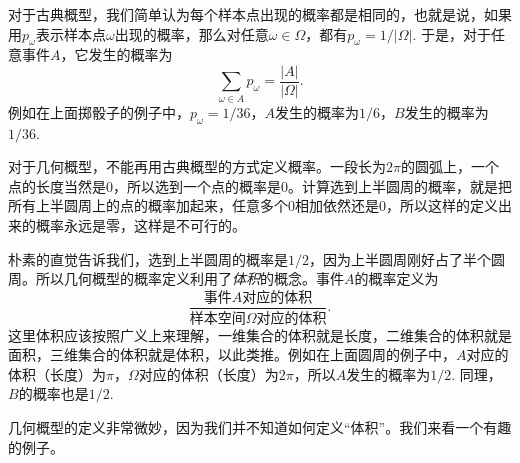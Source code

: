 对于古典概型，我们简单认为每个样本点出现的概率都是相同的，也就是说，如果用$p_\omega$表示样本点$\omega$出现的概率，那么对任意$\omega\in\Omega$，都有$p_\omega = 1/|\Omega|$. 于是，对于任意事件$A$，它发生的概率为
\[
    \sum_{\omega\in A} p_\omega = \frac{|A|}{|\Omega|}.
\]
例如在上面掷骰子的例子中，$p_\omega=1/36$，$A$发生的概率为$1/6$，$B$发生的概率为$1/36$.

对于几何概型，不能再用古典概型的方式定义概率。一段长为$2\pi$的圆弧上，一个点的长度当然是$0$，所以选到一个点的概率是$0$。计算选到上半圆周的概率，就是把所有上半圆周上的点的概率加起来，任意多个$0$相加依然还是$0$，所以这样的定义出来的概率永远是零，这样是不可行的。

朴素的直觉告诉我们，选到上半圆周的概率是$1/2$，因为上半圆周刚好占了半个圆周。所以几何概型的概率定义利用了\emph{体积}的概念。事件$A$的概率定义为
\[
    \frac{\text{事件$A$对应的体积}}{\text{样本空间$\Omega$对应的体积}}.
\]
这里体积应该按照广义上来理解，一维集合的体积就是长度，二维集合的体积就是面积，三维集合的体积就是体积，以此类推。例如在上面圆周的例子中，$A$对应的体积（长度）为$\pi$，$\Omega$对应的体积（长度）为$2\pi$，所以$A$发生的概率为$1/2$. 同理，$B$的概率也是$1/2$.

几何概型的定义非常微妙，因为我们并不知道如何定义“体积”。我们来看一个有趣的例子。


